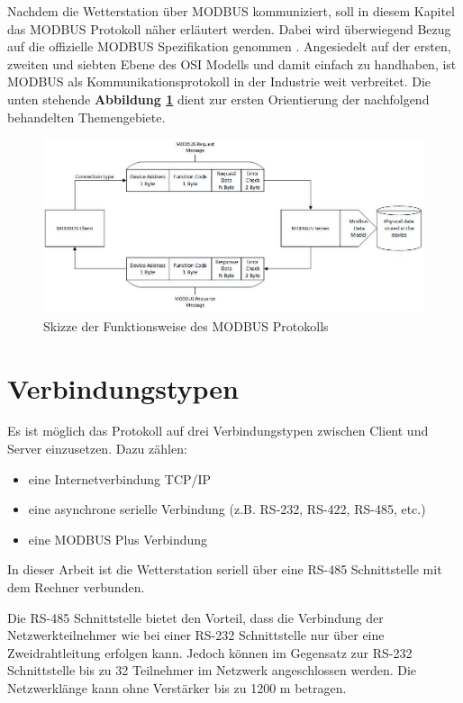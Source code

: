 Nachdem die Wetterstation über MODBUS kommuniziert, soll in diesem Kapitel das MODBUS Protokoll näher erläutert werden. Dabei wird überwiegend Bezug auf die offizielle MODBUS Spezifikation genommen \cite{ModbusDoc}. Angesiedelt auf der ersten, zweiten und siebten Ebene des OSI Modells und damit einfach zu handhaben, ist MODBUS als Kommunikationsprotokoll in der Industrie weit verbreitet. Die unten stehende \textbf{Abbildung \ref{fig:prinzip}} dient zur ersten Orientierung der nachfolgend behandelten Themengebiete. 
\begin{figure}[hbtp]
\centering
\includegraphics[scale=0.65]{modbus/msgskizze2}
\caption{Skizze der Funktionsweise des MODBUS Protokolls \cite[S. 5]{modicon}}
\label{fig:prinzip}
\end{figure}
\section{Verbindungstypen}
Es ist möglich das Protokoll auf drei Verbindungstypen zwischen Client und Server einzusetzen. Dazu zählen: 
\begin{itemize}
\item eine Internetverbindung TCP/IP 
\item eine asynchrone serielle Verbindung (z.B. RS-232, RS-422, RS-485, etc.)
\item eine MODBUS Plus Verbindung  
\end{itemize}
In dieser Arbeit ist die Wetterstation seriell über eine RS-485 Schnittstelle mit dem Rechner verbunden. 

Die RS-485 Schnittstelle bietet den Vorteil, dass die Verbindung der Netzwerkteilnehmer wie bei einer RS-232 Schnittstelle nur über eine Zweidrahtleitung erfolgen kann. Jedoch können im Gegensatz zur RS-232 Schnittstelle bis zu 32 Teilnehmer im Netzwerk angeschlossen werden. Die Netzwerklänge kann ohne Verstärker bis zu 1200 m betragen.\cite{Schleicher.2008} 


